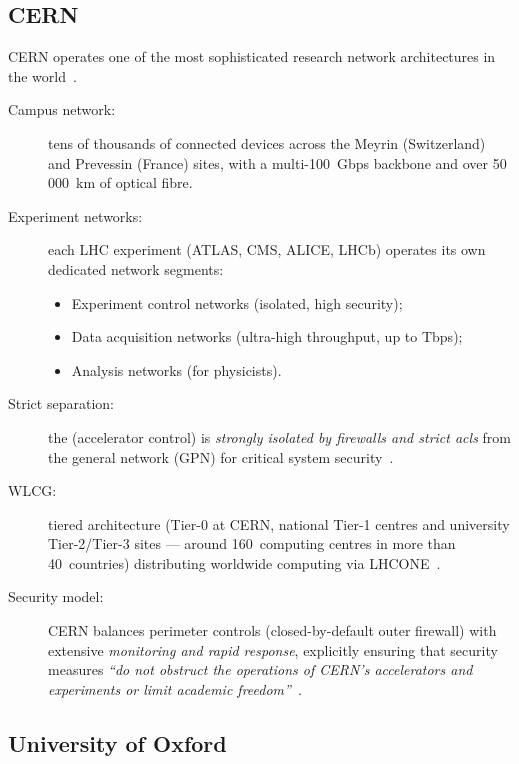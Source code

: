 \subsection{CERN}

CERN operates one of the most sophisticated research network
architectures in the world~\cite{cern-network}.

\begin{description}
    \item[Campus network:] tens of thousands of connected devices across
    the Meyrin (Switzerland) and Prevessin (France) sites, with a
    multi-100~Gbps backbone and over 50\,000~km of optical fibre.
    \item[Experiment networks:] each LHC experiment (ATLAS, CMS, ALICE,
    LHCb) operates its own dedicated network segments:
    \begin{itemize}[nosep]
        \item Experiment control networks (isolated, high security);
        \item Data acquisition networks (ultra-high throughput, up to
        Tbps);
        \item Analysis networks (for physicists).
    \end{itemize}
    \item[Strict separation:] the  (accelerator
    control) is \emph{strongly isolated by firewalls and strict \gls{acl}s}
    from the general network (GPN) for critical system
    security~\cite{cern-tn}.
    \item[WLCG:] tiered architecture (Tier-0 at CERN, national Tier-1
    centres and university Tier-2/Tier-3 sites --- around
    160~computing centres in more than 40~countries) distributing
    worldwide computing via LHCONE~\cite{cern-lhcone, cern-wlcg}.
    \item[Security model:] CERN balances perimeter controls
    (closed-by-default outer firewall) with extensive \emph{monitoring
    and rapid response}, explicitly ensuring that security measures
    \emph{``do not obstruct the operations of CERN's accelerators and
    experiments or limit academic
    freedom''}~\cite{cern-security-freedom}.
\end{description}

\subsection{University of Oxford}

